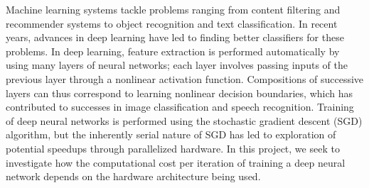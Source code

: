 Machine learning systems tackle problems ranging from content filtering and recommender systems to object recognition and text classification.  In recent years, advances in deep learning have led to finding better classifiers for these problems.  In deep learning, feature extraction is performed automatically by using many layers of neural networks; each layer involves passing inputs of the previous layer through a nonlinear activation function.  Compositions of successive layers can thus correspond to learning nonlinear decision boundaries, which has contributed to successes in image classification  and speech recognition.  Training of deep neural networks is performed using the stochastic gradient descent (SGD) algorithm, but the inherently serial nature of SGD has led to exploration of potential speedups through parallelized hardware.  In this project, we seek to investigate how the computational cost per iteration of training a deep neural network depends on the hardware architecture being used. 
